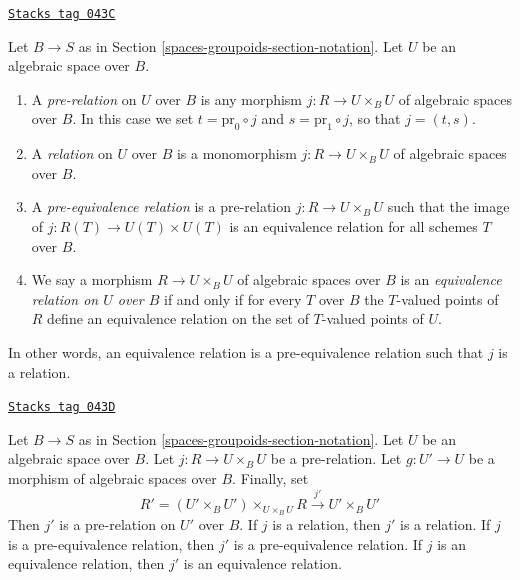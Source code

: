 \begin{definition}
\label{spaces-groupoids-definition-equivalence-relation}
\href{https://stacks.math.columbia.edu/tag/043C}{\texttt{Stacks tag 043C}}

Let $B \to S$ as in Section \ref{spaces-groupoids-section-notation}.
Let $U$ be an algebraic space over $B$.
\begin{enumerate}
\item A {\it pre-relation} on $U$ over $B$ is any morphism
$j : R \to U \times_B U$ of algebraic spaces over $B$.
In this case we set
$t = \text{pr}_0 \circ j$ and $s = \text{pr}_1 \circ j$, so
that $j = (t, s)$.
\item A {\it relation} on $U$ over $B$ is a monomorphism
$j : R \to U \times_B U$ of algebraic spaces over $B$.
\item A {\it pre-equivalence relation} is a pre-relation
$j : R \to U \times_B U$ such that the image of
$j : R(T) \to U(T) \times U(T)$ is an equivalence relation for
all schemes $T$ over $B$.
\item We say a morphism $R \to U \times_B U$ of algebraic spaces over $B$
is an {\it equivalence relation on $U$ over $B$}
if and only if for every $T$ over $B$ the $T$-valued
points of $R$ define an equivalence relation
on the set of $T$-valued points of $U$.
\end{enumerate}
\end{definition}

In other words, an equivalence relation is a pre-equivalence relation
such that $j$ is a relation.

\begin{lemma}
\label{spaces-groupoids-lemma-restrict-relation}
\href{https://stacks.math.columbia.edu/tag/043D}{\texttt{Stacks tag 043D}}

Let $B \to S$ as in Section \ref{spaces-groupoids-section-notation}.
Let $U$ be an algebraic space over $B$.
Let $j : R \to U \times_B U$ be a pre-relation.
Let $g : U' \to U$ be a morphism of algebraic spaces over $B$.
Finally, set
$$
R' = (U' \times_B U')\times_{U \times_B U} R
\xrightarrow{j'}
U' \times_B U'
$$
Then $j'$ is a pre-relation on $U'$ over $B$.
If $j$ is a relation, then $j'$ is a relation.
If $j$ is a pre-equivalence relation, then $j'$ is a pre-equivalence relation.
If $j$ is an equivalence relation, then $j'$ is an equivalence relation.
\end{lemma}

